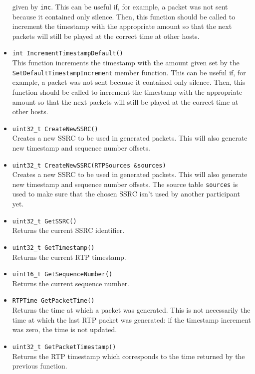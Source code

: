\documentclass[12pt,a4paper]{article}
\begin{document}
\begin{itemize}
						given by {\tt inc}. This can be useful if, for example,
						a packet was not sent because it contained only silence.
						Then, this function should be called to increment the
						timestamp with the appropriate amount so that the next
						packets will still be played at the correct time at
						other hosts.
					\item {\tt int IncrementTimestampDefault()}\\
						This function increments the timestamp with the amount
						given set by the {\tt SetDefaultTimestampIncrement}
						member function. This can be useful if, for example,
						a packet was not sent because it contained only silence.
						Then, this function should be called to increment the
						timestamp with the appropriate amount so that the next
						packets will still be played at the correct time at
						other hosts.						
					\item {\tt uint32\_t CreateNewSSRC()}\\
						Creates a new SSRC to be used in generated packets. This
						will also generate new timestamp and sequence number
						offsets.
					\item {\tt uint32\_t CreateNewSSRC(RTPSources \&sources)}\\
						Creates a new SSRC to be used in generated packets. This
						will also generate new timestamp and sequence number
						offsets. The source table {\tt sources} is used to make
						sure that the chosen SSRC isn't used by another participant
						yet.
					\item {\tt uint32\_t GetSSRC()}\\
						Returns the current SSRC identifier.
					\item {\tt uint32\_t GetTimestamp()}\\
						Returns the current RTP timestamp.
					\item {\tt uint16\_t GetSequenceNumber()}\\
						Returns the current sequence number.
					\item {\tt RTPTime GetPacketTime()}\\
						Returns the time at which a packet was generated. This
						is not necessarily the time at which the last RTP packet
						was generated: if the timestamp increment was zero, the
						time is not updated.
					\item {\tt uint32\_t GetPacketTimestamp()}\\
						Returns the RTP timestamp which corresponds to the time 
						returned by the previous function.
				\end{itemize}
				
\end{document}
